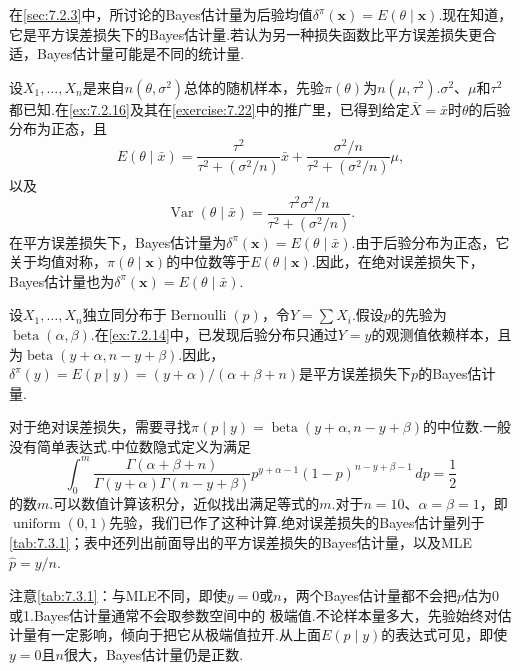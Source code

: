在\autoref{sec:7.2.3}中，所讨论的Bayes估计量为后验均值$\delta^\pi(\boldsymbol x)=E(\theta\mid\boldsymbol x)$.现在知道，它是平方误差损失下的Bayes估计量.若认为另一种损失函数比平方误差损失更合适，Bayes估计量可能是不同的统计量.
\begin{example}[正态分布的Bayes估计]\label{ex:7.3.29}
设$X_1,\ldots,X_n$是来自$n(\theta,\sigma^2)$总体的随机样本，先验$\pi(\theta)$为$n(\mu,\tau^2)$.$\sigma^2$、$\mu$和$\tau^2$都已知.在\autoref{ex:7.2.16}及其在\autoref{exercise:7.22}中的推广里，已得到给定$\bar X=\bar x$时$\theta$的后验分布为正态，且
$$E(\theta\mid\bar x)=\frac{\tau^2}{\tau^2+(\sigma^2/n)}\bar x+\frac{\sigma^2/n}{\tau^2+(\sigma^2/n)}\mu,$$
以及
$$\operatorname{Var}(\theta\mid\bar x)=\frac{\tau^2\sigma^2/n}{\tau^2+(\sigma^2/n)}.$$
在平方误差损失下，Bayes估计量为$\delta^\pi(\boldsymbol x)=E(\theta\mid\bar x)$.由于后验分布为正态，它关于均值对称，$\pi(\theta\mid\boldsymbol x)$的中位数等于$E(\theta\mid\boldsymbol x)$.因此，在绝对误差损失下，Bayes估计量也为$\delta^\pi(\boldsymbol x)=E(\theta\mid\bar x)$.
\end{example}
\begin{example}[二项分布的Bayes估计]\label{ex:7.3.30}
设$X_1,\ldots,X_n$独立同分布于$\operatorname{Bernoulli}(p)$，令$Y=\sum X_i$.假设$p$的先验为$\operatorname{beta}(\alpha,\beta)$.在\autoref{ex:7.2.14}中，已发现后验分布只通过$Y=y$的观测值依赖样本，且为$\operatorname{beta}(y+\alpha,n-y+\beta)$.因此，$\delta^\pi(y)=E(p\mid y)=(y+\alpha)/(\alpha+\beta+n)$是平方误差损失下$p$的Bayes估计量.

对于绝对误差损失，需要寻找$\pi(p\mid y)=\operatorname{beta}(y+\alpha,n-y+\beta)$的中位数.一般没有简单表达式.中位数隐式定义为满足
$$\int_0^m\frac{\Gamma(\alpha+\beta+n)}{\Gamma(y+\alpha)\Gamma(n-y+\beta)}p^{y+\alpha-1}(1-p)^{n-y+\beta-1}\,dp=\frac12$$
的数$m$.可以数值计算该积分，近似找出满足等式的$m$.对于$n=10$、$\alpha=\beta=1$，即$\operatorname{uniform}(0,1)$先验，我们已作了这种计算.绝对误差损失的Bayes估计量列于\autoref{tab:7.3.1}；表中还列出前面导出的平方误差损失的Bayes估计量，以及MLE $\widehat p=y/n$.

注意\autoref{tab:7.3.1}：与MLE不同，即使$y=0$或$n$，两个Bayes估计量都不会把$p$估为0或1.Bayes估计量通常不会取参数空间中的
极端值.不论样本量多大，先验始终对估计量有一定影响，倾向于把它从极端值拉开.从上面$E(p\mid y)$的表达式可见，即使$y=0$且$n$很大，Bayes估计量仍是正数.
\end{example}
